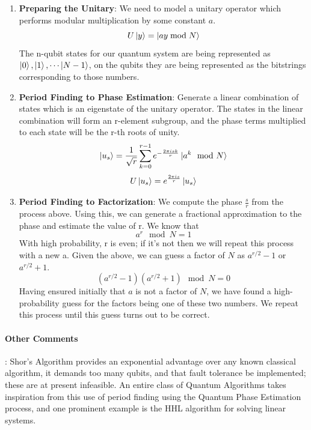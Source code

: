 \begin{enumerate}
    \item \textbf{Preparing the Unitary}: We need to model a unitary operator which performs modular multiplication by some constant $a$.
    \begin{equation}
        U \ket{y} = \ket{ay \;\text{mod}\; N}
    \end{equation}
    The n-qubit states for our quantum system are being represented as $\ket{0}, \ket{1}, \cdots \ket{N - 1}$, on the qubits they are being represented as the bitstrings corresponding to those numbers.
    \item \textbf{Period Finding to Phase Estimation}: Generate a linear combination of states which is an eigenstate of the unitary operator. The states in the linear combination will form an r-element subgroup, and the phase terms multiplied to each state will be the r-th roots of unity.
    \begin{equation}
        \ket{u_s} = \frac{1}{\sqrt{r}} \sum_{k=0}^{r-1} e^{-\frac{2\pi i s k}{r}} \ket{a^k \mod N}
    \end{equation}
    \begin{equation}
        U \ket{u_s} = e^{\frac{2 \pi i s}{r}} \ket{u_s}
    \end{equation}
    \item \textbf{Period Finding to Factorization}: We compute the phase $\frac{s}{r}$ from the process above. Using this, we can generate a fractional approximation to the phase and estimate the value of r. We know that
    \begin{equation}
        a^r \mod N = 1
    \end{equation}
    With high probability, r is even; if it's not then we will repeat this process with a new a. Given the above, we can guess a factor of $N$ as $a^{r/2} - 1$ or $a^{r/2} + 1$.
    \begin{equation}
        (a^{r/2} - 1) (a^{r/2} + 1) \mod N = 0
    \end{equation}
    Having ensured initially that $a$ is not a factor of $N$, we have found a high-probability guess for the factors being one of these two numbers. We repeat this process until this guess turns out to be correct.
\end{enumerate}

\paragraph*{Other Comments}: Shor's Algorithm provides an exponential advantage over any known classical algorithm, it demands too many qubits, and that fault tolerance be implemented; these are at present infeasible. An entire class of Quantum Algorithms takes inspiration from this use of period finding using the Quantum Phase Estimation process, and one prominent example is the HHL algorithm \cite{quantum-algo-hhl} for solving linear systems.

